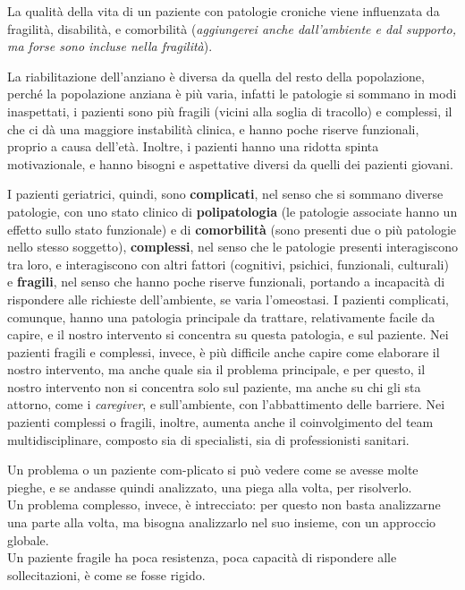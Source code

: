 La qualità della vita di un paziente con patologie croniche viene influenzata da
fragilità, disabilità, e comorbilità (\textit{aggiungerei anche dall'ambiente e
dal supporto, ma forse sono incluse nella fragilità}).

La riabilitazione dell'anziano è diversa da quella del resto della popolazione,
perché la popolazione anziana è più varia, infatti le patologie si sommano in modi 
inaspettati, i pazienti sono più fragili (vicini alla soglia di tracollo) e
complessi, il che ci dà una maggiore instabilità clinica, e hanno poche riserve
funzionali, proprio a causa dell'età. Inoltre, i pazienti hanno una ridotta
spinta motivazionale, e hanno bisogni e aspettative diversi da quelli dei
pazienti giovani.

I pazienti geriatrici, quindi, sono \textbf{complicati}, nel senso che si
sommano diverse patologie, con uno stato clinico di \textbf{polipatologia} (le
patologie associate hanno un effetto sullo stato funzionale) e di
\textbf{comorbilità} (sono presenti due o più patologie nello stesso soggetto),
\textbf{complessi}, nel senso che le patologie presenti interagiscono tra loro,
e interagiscono con altri fattori (cognitivi, psichici, funzionali, culturali)
e \textbf{fragili}, nel senso che hanno poche riserve funzionali, portando a
incapacità di rispondere alle richieste dell'ambiente, se varia l'omeostasi.
I pazienti complicati, comunque, hanno una patologia principale da trattare,
relativamente facile da capire, e il nostro intervento si concentra su questa
patologia, e sul paziente.
Nei pazienti fragili e complessi, invece, è più difficile anche capire come
elaborare il nostro intervento, ma anche quale sia il problema principale, e per
questo, il nostro intervento non si concentra solo sul paziente, ma anche su chi
gli sta attorno, come i \textit{caregiver}, e sull'ambiente, con l'abbattimento
delle barriere. Nei pazienti complessi o fragili, inoltre, aumenta anche il
coinvolgimento del team multidisciplinare, composto sia di specialisti, sia di
professionisti sanitari.

Un problema o un paziente com-plicato si può vedere come se avesse molte pieghe,
e se andasse quindi analizzato, una piega alla volta, per risolverlo.
\\ Un problema complesso, invece, è intrecciato: per questo non basta
analizzarne una parte alla volta, ma bisogna analizzarlo nel suo insieme, con un
approccio globale.
\\ Un paziente fragile ha poca resistenza, poca capacità di rispondere alle
sollecitazioni, è come se fosse rigido.

